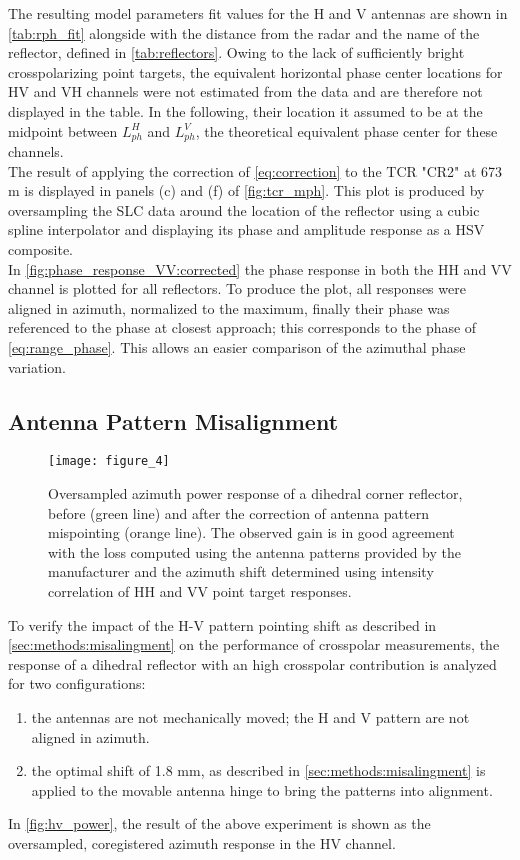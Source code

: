 The resulting model parameters fit values for the H and V antennas are shown in \autoref{tab:rph_fit} alongside with the distance from the radar and the name of the reflector, defined in \autoref{tab:reflectors}. Owing to the lack of sufficiently bright crosspolarizing point targets, the equivalent horizontal phase center locations for HV and VH channels were not estimated from the data and are therefore not displayed in the table. In the following, their location it assumed to be at the midpoint between $L_{ph}^{H}$ and $L_{ph}^{V}$, the theoretical equivalent phase center for these channels.\\
The result of applying the correction of \eqref{eq:correction} to the TCR "CR2" at 673 m is displayed in panels (c) and (f) of \autoref{fig:tcr_mph}. This plot is produced by oversampling the SLC data around the location of the reflector using a cubic spline interpolator and displaying its phase and amplitude response as a HSV composite.\\
In \autoref{fig:phase_response_VV:corrected} the phase response in both the HH and VV channel is plotted for all reflectors. To produce the plot, all responses were aligned in azimuth, normalized to the maximum, finally their phase was referenced to the phase at closest approach; this corresponds to the phase of \eqref{eq:range_phase}. This allows an easier comparison of the azimuthal phase variation.
\subsection{Antenna Pattern Misalignment}\label{sec:results:misalignment}
\begin{figure}[Ht!]
	\centering
	\texttt{[image: figure\_4]}
	\caption{Oversampled azimuth power response of a dihedral corner reflector, before (green line) and after the correction of antenna pattern mispointing (orange line). The observed gain is in good agreement with the loss computed using the antenna patterns provided by the manufacturer and the azimuth shift determined using intensity correlation of HH and VV point target responses.}
	\label{fig:hv_power}
\end{figure}
To verify the impact of the H-V pattern pointing shift as described in \autoref{sec:methods:misalingment} on the performance of crosspolar measurements, the response of a dihedral reflector with an high crosspolar contribution is analyzed for two configurations:\\ 
\begin{enumerate}
	\item the antennas are not mechanically moved; the H and V pattern are not aligned in azimuth.
	\item the optimal shift of 1.8 mm, as described in \autoref{sec:methods:misalingment} is applied to the movable antenna hinge to bring the patterns into alignment.\\ 
\end{enumerate}
In \autoref{fig:hv_power}, the result of the above experiment is shown as the oversampled, coregistered azimuth response in the HV channel.
